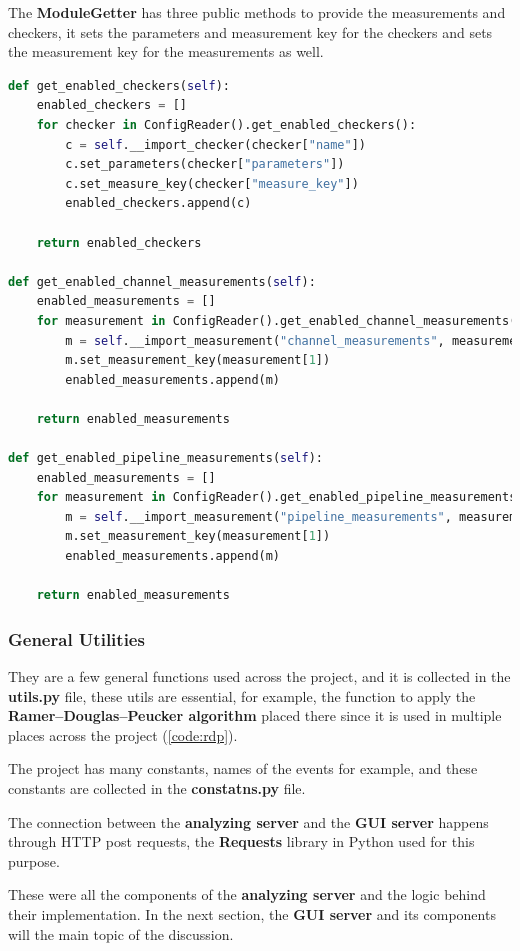 The \textbf{ModuleGetter} has three public methods to provide the measurements and checkers, it sets the
parameters and measurement key for the checkers and sets the measurement key for the measurements as well.
\newline
\begin{lstlisting}[language=Python, caption={Puplic methods of the ModuleGetter},captionpos=b]
def get_enabled_checkers(self):
	enabled_checkers = []
	for checker in ConfigReader().get_enabled_checkers():
		c = self.__import_checker(checker["name"])
		c.set_parameters(checker["parameters"])
		c.set_measure_key(checker["measure_key"])
		enabled_checkers.append(c)

	return enabled_checkers

def get_enabled_channel_measurements(self):
	enabled_measurements = []
	for measurement in ConfigReader().get_enabled_channel_measurements():
		m = self.__import_measurement("channel_measurements", measurement[0])
		m.set_measurement_key(measurement[1])
		enabled_measurements.append(m)

	return enabled_measurements

def get_enabled_pipeline_measurements(self):
	enabled_measurements = []
	for measurement in ConfigReader().get_enabled_pipeline_measurements():
		m = self.__import_measurement("pipeline_measurements", measurement[0])
		m.set_measurement_key(measurement[1])
		enabled_measurements.append(m)

	return enabled_measurements
\end{lstlisting}

\subsubsection{General Utilities}
They are a few general functions used across the project, and it is collected in the \textbf{utils.py} file,
these utils are essential, for example, the function to apply the \textbf{Ramer–Douglas–Peucker algorithm}
placed there since it is used in multiple places across the project (\ref{code:rdp}).

The project has many constants, names of the events for example, and these constants are collected in the
\textbf{constatns.py} file.

The connection between the \textbf{analyzing server} and the \textbf{GUI server} happens through HTTP post requests,
the \textbf{Requests}\cite{requests_library} library in Python used for this purpose.

These were all the components of the \textbf{analyzing server} and the logic behind their implementation. In
the next section, the \textbf{GUI server} and its components will the main topic of the discussion.

